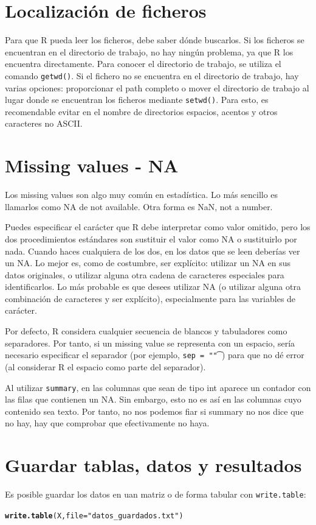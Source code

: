 \documentclass{config/apuntes}\usepackage[]{graphicx}\usepackage[]{xcolor}
\makeatletter
\newcommand{\hlsng}[1]{\textcolor[rgb]{0.192,0.494,0.8}{#1}}%
\newcommand{\hldef}[1]{\textcolor[rgb]{0.345,0.345,0.345}{#1}}%
\newcommand{\hlkwc}[1]{\textcolor[rgb]{0.333,0.667,0.333}{#1}}%
\newcommand{\hlkwd}[1]{\textcolor[rgb]{0.737,0.353,0.396}{\textbf{#1}}}%
\newenvironment{kframe}{%
 \def\at@end@of@kframe{}%
 \ifinner\ifhmode%
  \def\at@end@of@kframe{\end{minipage}}%
  \begin{minipage}{\columnwidth}%
 \fi\fi%
 \def\FrameCommand##1{\hskip\@totalleftmargin \hskip-\fboxsep
 \colorbox{shadecolor}{##1}\hskip-\fboxsep
     \hskip-\linewidth \hskip-\@totalleftmargin \hskip\columnwidth}%
 \MakeFramed {\advance\hsize-\width
   \@totalleftmargin\z@ \linewidth\hsize
   \@setminipage}}%
 {\par\unskip\endMakeFramed%
 \at@end@of@kframe}
\newenvironment{knitrout}{}{} %
\newcommand{\code}[1]{\texttt{#1}}
\makeatother
\begin{document}
\section{Localización de ficheros}
Para que R pueda leer los ficheros, debe saber dónde buscarlos. Si los ficheros se encuentran en el directorio de trabajo, no hay ningún problema, ya que R los encuentra directamente. Para conocer el directorio de trabajo, se utiliza el comando \code{getwd()}. Si el fichero no se encuentra en el directorio de trabajo, hay varias opciones: proporcionar el path completo o mover el directorio de trabajo al lugar donde se encuentran los ficheros mediante \code{setwd()}. Para esto, es recomendable evitar en el nombre de directorios espacios, acentos y otros caracteres no ASCII.

\section{Missing values - NA}
Los missing values son algo muy común en estadística. Lo más sencillo es llamarlos como NA de not available. Otra forma es NaN, not a number. 

Puedes especificar el carácter que R debe interpretar como valor omitido, pero los dos procedimientos estándares son sustituir el valor como NA o sustituirlo por nada. Cuando haces cualquiera de los dos, en los datos que se leen deberías ver un NA. Lo mejor es, como de costumbre, ser explícito: utilizar un NA en sus datos originales, o utilizar alguna otra cadena de caracteres especiales para identificarlos. Lo más probable es que desees utilizar NA (o utilizar alguna otra combinación de caracteres y ser explícito), especialmente para las variables de carácter.

Por defecto, R considera cualquier secuencia de blancos y tabuladores como separadores. Por tanto, si un missing value se representa con un espacio, sería necesario especificar el separador (por ejemplo, \code{sep = "\t"}) para que no dé error (al considerar R el espacio como parte del separador).

Al utilizar \code{summary}, en las columnas que sean de tipo int aparece un contador con las filas que contienen un NA. Sin embargo, esto no es así en las columnas cuyo contenido sea texto. Por tanto, no nos podemos fiar si summary no nos dice que no hay, hay que comprobar que efectivamente no haya. 

\section{Guardar tablas, datos y resultados}
Es posible guardar los datos en uan matriz o de forma tabular con \code{write.table}:
\begin{knitrout}
\color{fgcolor}\begin{kframe}
\begin{alltt}
\hlkwd{write.table}\hldef{(X,} \hlkwc{file} \hldef{=} \hlsng{"datos_guardados.txt"}\hldef{)}
\end{alltt}
\end{kframe}
\end{knitrout}
\end{document}
